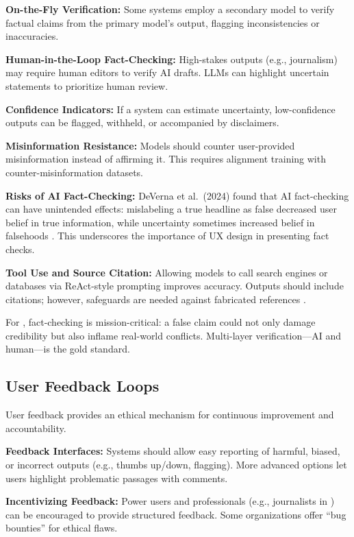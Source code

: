 \textbf{On-the-Fly Verification:} Some systems employ a secondary model to verify factual claims from the primary model's output, flagging inconsistencies or inaccuracies.

\textbf{Human-in-the-Loop Fact-Checking:} High-stakes outputs (e.g., journalism) may require human editors to verify AI drafts. LLMs can highlight uncertain statements to prioritize human review.

\textbf{Confidence Indicators:} If a system can estimate uncertainty, low-confidence outputs can be flagged, withheld, or accompanied by disclaimers.

\textbf{Misinformation Resistance:} Models should counter user-provided misinformation instead of affirming it. This requires alignment training with counter-misinformation datasets.

\textbf{Risks of AI Fact-Checking:} DeVerna et al.\ (2024) found that AI fact-checking can have unintended effects: mislabeling a true headline as false decreased user belief in true information, while uncertainty sometimes increased belief in falsehoods \cite{pmc2024}. This underscores the importance of UX design in presenting fact checks.

\textbf{Tool Use and Source Citation:} Allowing models to call search engines or databases via ReAct-style prompting improves accuracy. Outputs should include citations; however, safeguards are needed against fabricated references \cite{bcg2023}.

For \ishtar{}, fact-checking is mission-critical: a false claim could not only damage credibility but also inflame real-world conflicts. Multi-layer verification---AI and human---is the gold standard.

\subsection{User Feedback Loops}

User feedback provides an ethical mechanism for continuous improvement and accountability.

\textbf{Feedback Interfaces:} Systems should allow easy reporting of harmful, biased, or incorrect outputs (e.g., thumbs up/down, flagging). More advanced options let users highlight problematic passages with comments.

\textbf{Incentivizing Feedback:} Power users and professionals (e.g., journalists in \ishtar{}) can be encouraged to provide structured feedback. Some organizations offer ``bug bounties'' for ethical flaws.

